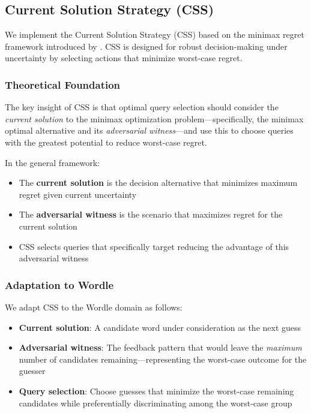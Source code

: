 
\subsection{Current Solution Strategy (CSS)}
\label{sec:css}

We implement the Current Solution Strategy (CSS) based on the minimax regret framework introduced by \citet{lu2011robust}. CSS is designed for robust decision-making under uncertainty by selecting actions that minimize worst-case regret.

\subsubsection{Theoretical Foundation}

The key insight of CSS is that optimal query selection should consider the \textit{current solution} to the minimax optimization problem---specifically, the minimax optimal alternative and its \textit{adversarial witness}---and use this to choose queries with the greatest potential to reduce worst-case regret.

In the general framework:
\begin{itemize}
    \item The \textbf{current solution} is the decision alternative that minimizes maximum regret given current uncertainty
    \item The \textbf{adversarial witness} is the scenario that maximizes regret for the current solution
    \item CSS selects queries that specifically target reducing the advantage of this adversarial witness
\end{itemize}

\subsubsection{Adaptation to Wordle}

We adapt CSS to the Wordle domain as follows:
\begin{itemize}
    \item \textbf{Current solution}: A candidate word under consideration as the next guess
    \item \textbf{Adversarial witness}: The feedback pattern that would leave the \textit{maximum} number of candidates remaining---representing the worst-case outcome for the guesser
    \item \textbf{Query selection}: Choose guesses that minimize the worst-case remaining candidates while preferentially discriminating among the worst-case group
\end{itemize}

